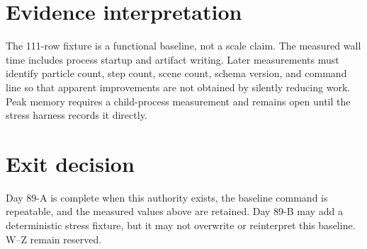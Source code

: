 \documentclass[11pt]{article}
\begin{document}
\section{Evidence interpretation}
The 111-row fixture is a functional baseline, not a scale claim. The measured wall time includes process startup and artifact writing. Later measurements must identify particle count, step count, scene count, schema version, and command line so that apparent improvements are not obtained by silently reducing work. Peak memory requires a child-process measurement and remains open until the stress harness records it directly.

\section{Exit decision}
Day 89-A is complete when this authority exists, the baseline command is repeatable, and the measured values above are retained. Day 89-B may add a deterministic stress fixture, but it may not overwrite or reinterpret this baseline. W--Z remain reserved.
\end{document}
